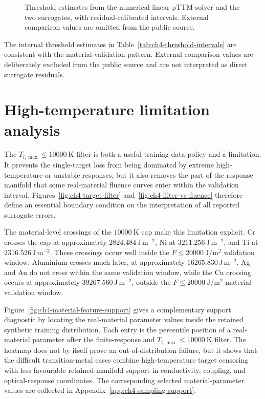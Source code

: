 \begin{figure}[htbp]
    \centering
    \PublicExternalValuesOmitted[0.82\textwidth]
    \caption{Threshold estimates from the numerical linear pTTM solver and the two surrogates, with residual-calibrated intervals. External comparison values are omitted from the public source.}
    \label{fig:ch4-threshold-intervals}
\end{figure}

The internal threshold estimates in Table~\ref{tab:ch4-threshold-intervals} are consistent with the material-validation pattern. External comparison values are deliberately excluded from the public source and are not interpreted as direct surrogate residuals.

\section{High-temperature limitation analysis}

The $T_{l,\max}\leq\SI{10000}{\kelvin}$ filter is both a useful training-data policy and a limitation. It prevents the single-target loss from being dominated by extreme high-temperature or unstable responses, but it also removes the part of the response manifold that some real-material fluence curves enter within the validation interval. Figures~\ref{fig:ch4-target-filter} and~\ref{fig:ch4-filter-vs-fluence} therefore define an essential boundary condition on the interpretation of all reported surrogate errors.

The material-level crossings of the $\SI{10000}{\kelvin}$ cap make this limitation explicit. Cr crosses the cap at approximately $2824.484\,\mathrm{J\,m^{-2}}$, Ni at $3211.256\,\mathrm{J\,m^{-2}}$, and Ti at $2316.526\,\mathrm{J\,m^{-2}}$. These crossings occur well inside the $F\leq\SI{20000}{\joule\per\metre\squared}$ validation window. Aluminium crosses much later, at approximately $16265.830\,\mathrm{J\,m^{-2}}$. Ag and Au do not cross within the same validation window, while the Cu crossing occurs at approximately $39267.560\,\mathrm{J\,m^{-2}}$, outside the $F\leq\SI{20000}{\joule\per\metre\squared}$ material-validation window.

Figure~\ref{fig:ch4-material-feature-support} gives a complementary support diagnostic by locating the real-material parameter values inside the retained synthetic training distribution. Each entry is the percentile position of a real-material parameter after the finite-response and $T_{l,\max}\leq\SI{10000}{\kelvin}$ filter. The heatmap does not by itself prove an out-of-distribution failure, but it shows that the difficult transition-metal cases combine high-temperature target censoring with less favourable retained-manifold support in conductivity, coupling, and optical-response coordinates. The corresponding selected material-parameter values are collected in Appendix~\ref{app:ch4-sampling-support}.

